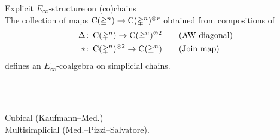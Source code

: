 \begin{frame}{Explicit $E_\infty$-structure on (co)chains}
	\pause
	 \\
	The collection of maps $\operatorname{C}(\mathbb{\Delta}^n) \to \operatorname{C}(\mathbb{\Delta}^n)^{\otimes r}$ obtained from compositions of
	\begin{align*}
		\Delta &\colon \operatorname{C}(\mathbb{\Delta}^n) \to \operatorname{C}(\mathbb{\Delta}^n)^{\otimes 2}
		\qquad \text{(AW diagonal)} \\
		\ast &\colon \operatorname{C}(\mathbb{\Delta}^n)^{\otimes 2} \to \operatorname{C}(\mathbb{\Delta}^n)
		\qquad \text{(Join map)}
	\end{align*}
	defines an $E_\infty$-coalgebra on simplicial chains.

	\bigskip\pause
	 \\
	\qquad\qquad \scalebox{0.7}{}

	\bigskip\pause
	 \\
	 Cubical (Kaufmann--Med.) \\
	 Multisimplicial (Med.--Pizzi--Salvatore).
\end{frame}

